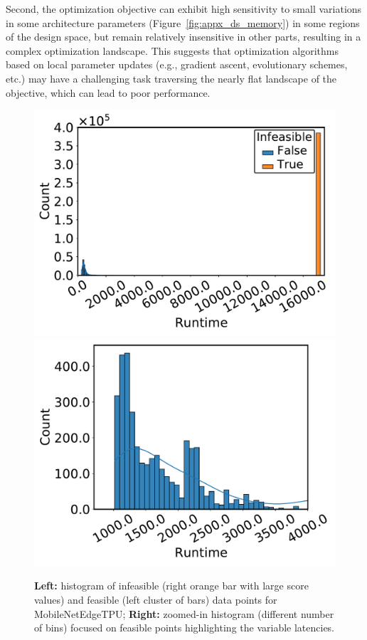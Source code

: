 Second, the optimization objective can exhibit high sensitivity to small variations in some architecture parameters (Figure~\ref{fig:appx_ds_memory}) in some regions of the design space, but remain relatively insensitive in other parts, resulting in a complex optimization landscape. This suggests that optimization algorithms based on local parameter updates (e.g., gradient ascent,  evolutionary schemes, etc.) may have a challenging task traversing the nearly flat landscape of the objective, which can lead to poor performance.
\begin{figure}[t]
    \begin{center}
    \begin{minipage}{\linewidth}
    \centering
    \includegraphics[width=0.35\linewidth]{chapters/prime/figs/dataset/dist.pdf}
    \vspace{-0.1cm}
    \label{fig:ds_dist}
    \centering
    \includegraphics[width=0.35\linewidth]{chapters/prime/figs/dataset/dist_large.pdf}
    \label{fig:ds_dist_large}
    \end{minipage}
    \end{center}
    \vspace{-0.2cm}
    \caption{\footnotesize{\textbf{Left:} histogram of infeasible (right orange bar with large score values) and feasible (left cluster of bars) data points for MobileNetEdgeTPU; \textbf{Right:} zoomed-in histogram (different number of bins) focused on feasible points highlighting the variable latencies.}}
    \vspace{-0.5cm}
    \label{fig:ds_dist_all}
\end{figure}

